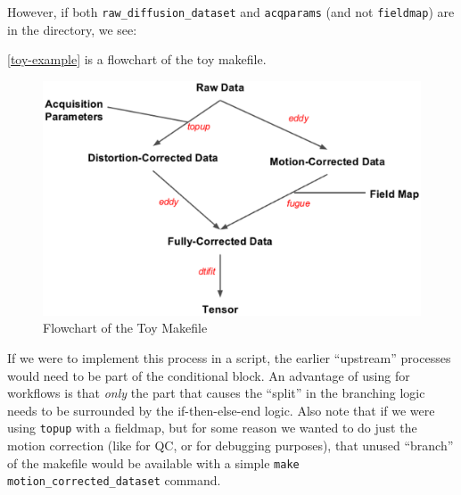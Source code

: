 
However, if both \texttt{raw_diffusion_dataset} and \texttt{acqparams} (and not \texttt{fieldmap}) are in the directory, we see:


\autoref{toy-example} is a flowchart of the toy makefile.

\begin{figure}
	\begin{center}  %
		\includegraphics[width=\textwidth]{images/distcorr-flowchart.eps}
	\end{center}
	\caption{Flowchart of the Toy Makefile}
	\label{toy-example}
\end{figure}


If we were to implement this process in a \bashn{} script, the earlier
``upstream'' processes would need to be part of the conditional
block. An advantage of using \maken{} for workflows is that
\emph{only} the part that causes the ``split'' in the branching logic
needs to be surrounded by the if-then-else-end logic. Also note that
if we were using \texttt{topup} with a fieldmap, but for some reason
we wanted to do just the motion correction (like for QC, or for
debugging purposes), that unused ``branch'' of the makefile would be
available with a simple \texttt{make motion_corrected_dataset}
command. \newpage


